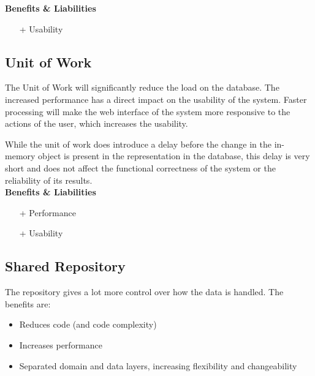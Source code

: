 \textbf{Benefits \& Liabilities} ~
\begin{itemize} 
\item[+] Usability
\end{itemize}

\subsection*{Unit of Work}
The Unit of Work will significantly reduce the load on the database. The increased performance has a direct impact on the usability of the system. Faster processing will make the web interface of the system more responsive to the actions of the user, which increases the usability.

While the unit of work does introduce a delay before the change in the in-memory object is present in the representation in the database, this delay is very short and does not affect the functional correctness of the system or the reliability of its results.\\
\textbf{Benefits \& Liabilities} ~
\begin{itemize}
\item[+] Performance 
\item[+] Usability
\end{itemize}


\subsection*{Shared Repository} 
The repository gives a lot more control over how the data is handled. The benefits are:
\begin{itemize}
\item Reduces code (and code complexity)
\item Increases performance
\item Separated domain and data layers, increasing flexibility and changeability
\end{itemize}

